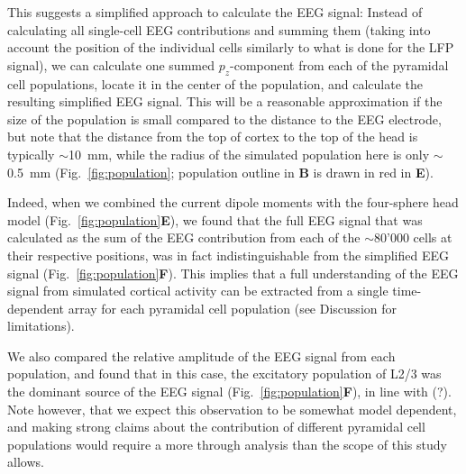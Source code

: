 \documentclass[preprint,10pt,authoryear]{elsarticle}
\newcommand{\hlg}[2][Emerald]{ {\sethlcolor{#1} \hl{#2}} }
\newcommand{\tvnnote}[1]{\color{white}{\hlg{TVN: #1 }}\color{black}}
\begin{document}
This suggests a simplified approach to calculate the EEG signal: Instead of calculating all single-cell EEG contributions and summing them (taking into account the position of the individual cells similarly to what is done for the LFP signal), we can calculate one summed $p_z$-component from each of the pyramidal cell populations, locate it in the center of the population, and calculate the resulting simplified EEG signal. This will be a reasonable approximation if the size of the population is small compared to the distance to the EEG electrode, but note that the distance from the top of cortex to the top of the head is typically $\sim$10~mm, while the radius of the simulated population here is only $\sim$0.5~mm (Fig.~\ref{fig:population}; population outline in \textbf{B} is drawn in red in \textbf{E}).

Indeed, when we combined the current dipole moments with the four-sphere head model (Fig.~\ref{fig:population}\textbf{E}), we found that the full EEG signal that was calculated as the sum of the EEG contribution from each of the $\sim$80'000 cells at their respective positions, was in fact indistinguishable from the simplified EEG signal (Fig.~\ref{fig:population}\textbf{F}). This implies that a full understanding of the EEG signal from simulated cortical activity can be extracted from a single time-dependent array for each pyramidal cell population (see Discussion for limitations).

We also compared the relative amplitude of the EEG signal from each population, and found that in this case, the excitatory population of L2/3 was the dominant source of the EEG signal (Fig.~\ref{fig:population}\textbf{F}), in line with (?)\tvnnote{(cite!)}. Note however, that we expect this observation to be somewhat model dependent, and making strong claims about the contribution of different pyramidal cell populations would require a more through analysis than the scope of this study allows.
\end{document}
